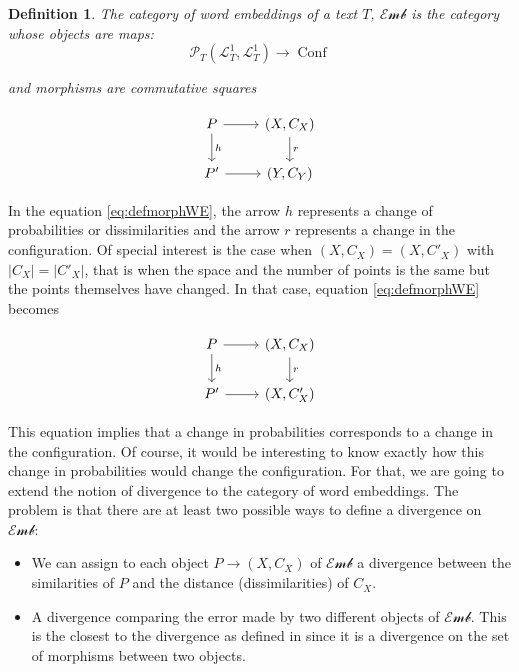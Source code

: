 \documentclass[10pt,a4paper]{elsarticle}
\renewcommand{\L}{\mathcal{L}}
\renewcommand{\P}{\mathcal{P}}
\newcommand{\Emb}{\mathcal{Emb}}
\newcommand{\Conf}{\operatorname{Conf}}
\newtheorem{definition}[theorem]{Definition}
\begin{document}
\begin{definition}\label{def:wordembeddings}
	The category of word embeddings of a text $T$, $\Emb$ is the category whose objects are maps:
	\begin{equation}
		\P_{T}(\L^{1}_{T},\L^{1}_{T})\to\Conf
	\end{equation}
	
	and morphisms are commutative squares
	
	\begin{equation}\label{eq:defmorphWE}
		\begin{tikzcd}
			P \arrow[d,"h"] \arrow[r]& (X,C_{X})\arrow[d,"r"] \\
			P'\arrow[r] & (Y,C_{Y})
		\end{tikzcd}
	\end{equation}
\end{definition}

In the equation \eqref{eq:defmorphWE}, the arrow $h$ represents a change of probabilities or dissimilarities and the arrow $r$ represents a change in the configuration. Of special interest is the case when $(X, C_{X})=(X, C'_{X})$ with $|C_{X}|=|C'_{X}|$, that is when the space and the number of points is the same but the points themselves have changed. In that case, equation \eqref{eq:defmorphWE} becomes

\begin{equation}
	\begin{tikzcd}
		P \arrow[d,"h"] \arrow[r]& (X,C_{X})\arrow[d,"r"] \\
		P'\arrow[r] & (X,C'_{X})
	\end{tikzcd}
\end{equation}

This equation implies that a change in probabilities corresponds to a change in the configuration. Of course, it would be interesting to know exactly how this change in probabilities would change the configuration. For that, we are going to extend the notion of divergence to the category of word embeddings. The problem is that there are at least two possible ways to define a divergence on $\Emb$:
\begin{itemize}
	\item We can assign to each object $P\to (X,C_{X})$ of $\Emb$ a divergence between the similarities of $P$ and the distance (dissimilarities) of $C_{X}$. 
	
	\item A divergence comparing the error made by two different objects of $\Emb$. This is the closest to the divergence as defined in \citep{perrone2023markov} since it is a divergence on the set of morphisms between two objects.
\end{itemize}
\end{document}
